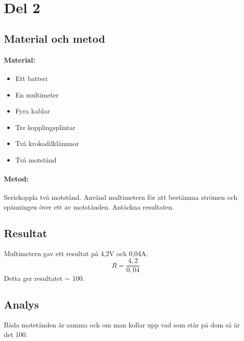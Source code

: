 \documentclass[11p]{article}
\begin{document}
    \section{Del 2}
    \subsection{Material och metod}
    \paragraph{Material:}
    \begin{itemize}
        \item Ett batteri
        \item En multimeter
        \item Fyra kablar
        \item Tre kopplingsplintar
        \item Två krokodilklämmor
        \item Två motstånd
    \end{itemize}
    \paragraph{Metod:}
    Seriekoppla två motstånd.
    Använd multimetern för att bestämma strömen och spänningen över ett av motstånden.
    Antäckna resultaten.

    \subsection{Resultat}
    Multimetern gav ett resultat på 4,2V och 0,04A.
    \begin{equation}
        R = \frac{4,2}{0,04}
    \end{equation}
    Detta ger resultatet $\sim$ 100\Omega.
    \subsection{Analys}
    Båda motstånden är samma och om man kollar upp vad som står på dom så är det 100\Omega.\Omega
\end{document}
